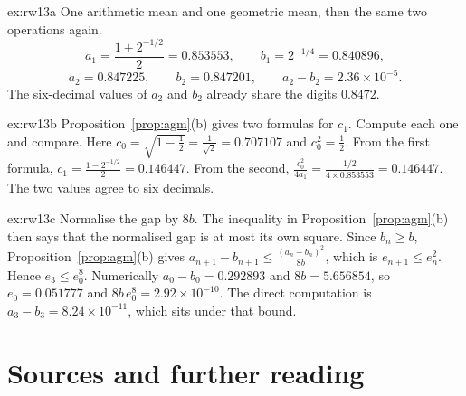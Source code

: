 \begin{solution}{ex:rw13a}
\idea One arithmetic mean and one geometric mean, then the same two operations again.
\writeup
\[
a_1=\frac{1+2^{-1/2}}2=0.853553,\qquad b_1=2^{-1/4}=0.840896,
\]
\[
a_2=0.847225,\qquad b_2=0.847201,\qquad a_2-b_2=2.36\times10^{-5}.
\]
The six-decimal values of $a_2$ and $b_2$ already share the digits $0.8472$.
\end{solution}

\begin{solution}{ex:rw13b}
\idea Proposition~\ref{prop:agm}(b) gives two formulas for $c_1$. Compute each one and compare.
\writeup Here $c_0=\sqrt{1-\frac12}=\frac1{\sqrt2}=0.707107$ and $c_0^2=\frac12$. From the first formula, $c_1=\frac{1-2^{-1/2}}2=0.146447$. From the second, $\frac{c_0^2}{4a_1}=\frac{1/2}{4\times0.853553}=0.146447$. The two values agree to six decimals.
\end{solution}

\begin{solution}{ex:rw13c}
\idea Normalise the gap by $8b$. The inequality in Proposition~\ref{prop:agm}(b) then says that the normalised gap is at most its own square.
\writeup Since $b_n\ge b$, Proposition~\ref{prop:agm}(b) gives $a_{n+1}-b_{n+1}\le\frac{(a_n-b_n)^2}{8b}$, which is $e_{n+1}\le e_n^2$. Hence $e_3\le e_0^8$. Numerically $a_0-b_0=0.292893$ and $8b=5.656854$, so $e_0=0.051777$ and $8b\,e_0^8=2.92\times10^{-10}$. The direct computation is $a_3-b_3=8.24\times10^{-11}$, which sits under that bound.
\end{solution}

\section*{Sources and further reading}

